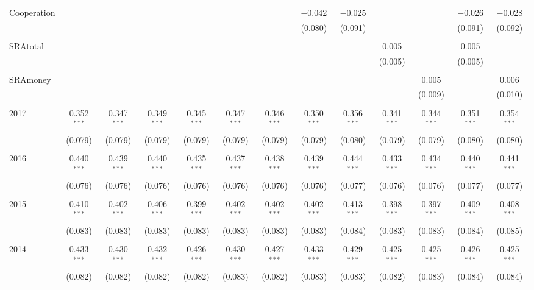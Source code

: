\begin{table}[H]
\begin{adjustbox}{width=\textwidth}
\begin{tabular}{@{\extracolsep{5pt}}lcccccccccccc}
 Cooperation &  &  &  &  &  &  & $-$0.042 & $-$0.025 &  &  & $-$0.026 & $-$0.028 \\ 
  &  &  &  &  &  &  & (0.080) & (0.091) &  &  & (0.091) & (0.092) \\ 
  & & & & & & & & & & & & \\ 
 SRAtotal &  &  &  &  &  &  &  &  & 0.005 &  & 0.005 &  \\ 
  &  &  &  &  &  &  &  &  & (0.005) &  & (0.005) &  \\ 
  & & & & & & & & & & & & \\ 
 SRAmoney &  &  &  &  &  &  &  &  &  & 0.005 &  & 0.006 \\ 
  &  &  &  &  &  &  &  &  &  & (0.009) &  & (0.010) \\ 
  & & & & & & & & & & & & \\ 
 2017 & 0.352$^{***}$ & 0.347$^{***}$ & 0.349$^{***}$ & 0.345$^{***}$ & 0.347$^{***}$ & 0.346$^{***}$ & 0.350$^{***}$ & 0.356$^{***}$ & 0.341$^{***}$ & 0.344$^{***}$ & 0.351$^{***}$ & 0.354$^{***}$ \\ 
  & (0.079) & (0.079) & (0.079) & (0.079) & (0.079) & (0.079) & (0.079) & (0.080) & (0.079) & (0.079) & (0.080) & (0.080) \\ 
  & & & & & & & & & & & & \\ 
 2016 & 0.440$^{***}$ & 0.439$^{***}$ & 0.440$^{***}$ & 0.435$^{***}$ & 0.437$^{***}$ & 0.438$^{***}$ & 0.439$^{***}$ & 0.444$^{***}$ & 0.433$^{***}$ & 0.434$^{***}$ & 0.440$^{***}$ & 0.441$^{***}$ \\ 
  & (0.076) & (0.076) & (0.076) & (0.076) & (0.076) & (0.076) & (0.076) & (0.077) & (0.076) & (0.076) & (0.077) & (0.077) \\ 
  & & & & & & & & & & & & \\ 
 2015 & 0.410$^{***}$ & 0.402$^{***}$ & 0.406$^{***}$ & 0.399$^{***}$ & 0.402$^{***}$ & 0.402$^{***}$ & 0.402$^{***}$ & 0.413$^{***}$ & 0.398$^{***}$ & 0.397$^{***}$ & 0.409$^{***}$ & 0.408$^{***}$ \\ 
  & (0.083) & (0.083) & (0.083) & (0.083) & (0.083) & (0.083) & (0.083) & (0.084) & (0.083) & (0.083) & (0.084) & (0.085) \\ 
  & & & & & & & & & & & & \\ 
 2014 & 0.433$^{***}$ & 0.430$^{***}$ & 0.432$^{***}$ & 0.426$^{***}$ & 0.430$^{***}$ & 0.427$^{***}$ & 0.433$^{***}$ & 0.429$^{***}$ & 0.425$^{***}$ & 0.425$^{***}$ & 0.426$^{***}$ & 0.425$^{***}$ \\ 
  & (0.082) & (0.082) & (0.082) & (0.082) & (0.083) & (0.082) & (0.083) & (0.083) & (0.082) & (0.083) & (0.084) & (0.084) \\ 

\end{tabular}
\end{adjustbox}
\end{table}
